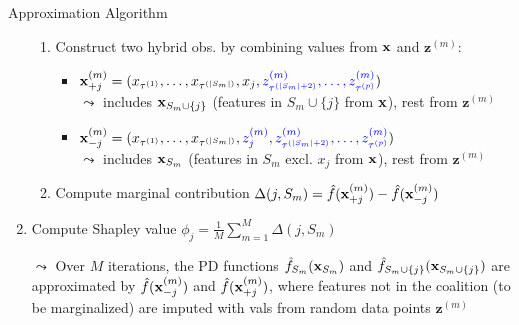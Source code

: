\documentclass[10pt,compress,t,notes=noshow, xcolor=table]{beamer}
\newcommand{\Sm}{S_m}%
\newcommand{\Smj}{\Sm \cup \{j\}}
\newcommand{\xjp}{\xv_{+j}^{(m)}}
\newcommand{\xjm}{\xv_{-j}^{(m)}}
\begin{document}
\begin{frame}{Approximation Algorithm }
\begin{enumerate}[<+->]
\begin{enumerate}
        \item Construct two hybrid obs. by combining values from $\mathbf{x}$ and {\color{blue} $\mathbf{z}^{(m)}$}:
\begin{itemize}
\setlength\itemsep{0.5em}
  \item $
  \xjp = (x_{\tau^{(1)}}, \ldots, x_{\tau^{(|\Sm|)}}, x_j, 
          {\color{blue}z_{\tau^{(|\Sm|+2)}}^{(m)}, \ldots, z_{\tau^{(p)}}^{(m)}})
  $\\
  $\leadsto$ includes $\xv_{\Smj}$ (features in $\Sm \cup \{j\}$ from $\mathbf{x}$), rest from {\color{blue} $\mathbf{z}^{(m)}$}
  
  \item $
  \xjm = (x_{\tau^{(1)}}, \ldots, x_{\tau^{(|\Sm|)}}, 
          {\color{blue}z_j^{(m)}, z_{\tau^{(|\Sm|+2)}}^{(m)}, \ldots, z_{\tau^{(p)}}^{(m)}})
  $\\
   $\leadsto$ includes $\xv_{\Sm}$ (features in $\Sm$ excl. $x_j$ from $\mathbf{x}$), rest from {\color{blue} $\mathbf{z}^{(m)}$}
\end{itemize}
        \item Compute marginal contribution $\Delta(j, \Sm) = \fh(\xjp) - \fh(\xjm)$ %
        \end{enumerate}
        
    \item Compute Shapley value $\phi_j = \frac{1}{M}\sum_{m=1}^M \Delta(j, \Sm)$ %
    \item[$\leadsto$] Over $M$ iterations, the PD functions $\fh_{\Sm}(\xv_{\Sm})$ and $\fh_{\Smj}(\xv_{\Smj})$ are approximated by $\fh(\xjm)$ and $\fh(\xjp)$, where features not in the coalition (to be marginalized) are imputed with vals from random data points {\color{blue} $\mathbf{z}^{(m)}$}
  \end{enumerate}
   

\end{frame}
\end{document}
